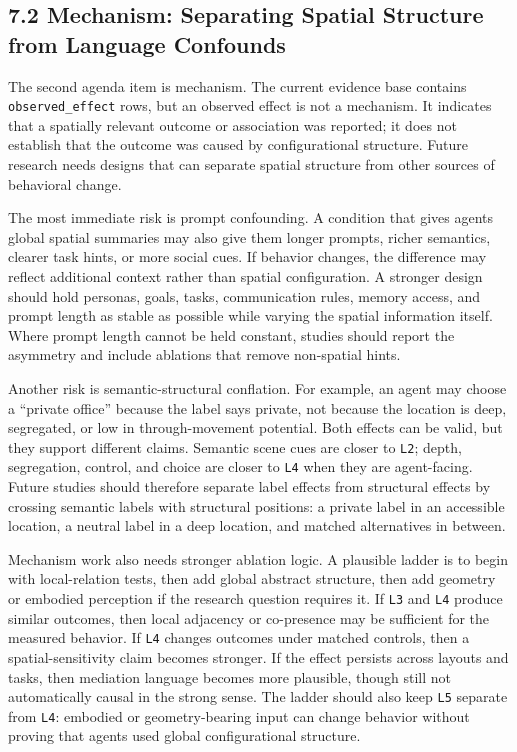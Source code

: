 \documentclass[
  twocolumn]{article}
\begin{document}
\subsection{7.2 Mechanism: Separating Spatial Structure from Language
Confounds}\label{mechanism-separating-spatial-structure-from-language-confounds}

The second agenda item is mechanism. The current evidence base contains
\texttt{observed\_effect} rows, but an observed effect is not a
mechanism. It indicates that a spatially relevant outcome or association
was reported; it does not establish that the outcome was caused by
configurational structure. Future research needs designs that can
separate spatial structure from other sources of behavioral change.

The most immediate risk is prompt confounding. A condition that gives
agents global spatial summaries may also give them longer prompts,
richer semantics, clearer task hints, or more social cues. If behavior
changes, the difference may reflect additional context rather than
spatial configuration. A stronger design should hold personas, goals,
tasks, communication rules, memory access, and prompt length as stable
as possible while varying the spatial information itself. Where prompt
length cannot be held constant, studies should report the asymmetry and
include ablations that remove non-spatial hints.

Another risk is semantic-structural conflation. For example, an agent
may choose a ``private office'' because the label says private, not
because the location is deep, segregated, or low in through-movement
potential. Both effects can be valid, but they support different claims.
Semantic scene cues are closer to \texttt{L2}; depth, segregation,
control, and choice are closer to \texttt{L4} when they are
agent-facing. Future studies should therefore separate label effects
from structural effects by crossing semantic labels with structural
positions: a private label in an accessible location, a neutral label in
a deep location, and matched alternatives in between.

Mechanism work also needs stronger ablation logic. A plausible ladder is
to begin with local-relation tests, then add global abstract structure,
then add geometry or embodied perception if the research question
requires it. If \texttt{L3} and \texttt{L4} produce similar outcomes,
then local adjacency or co-presence may be sufficient for the measured
behavior. If \texttt{L4} changes outcomes under matched controls, then a
spatial-sensitivity claim becomes stronger. If the effect persists
across layouts and tasks, then mediation language becomes more
plausible, though still not automatically causal in the strong sense.
The ladder should also keep \texttt{L5} separate from \texttt{L4}:
embodied or geometry-bearing input can change behavior without proving
that agents used global configurational structure.
\end{document}
